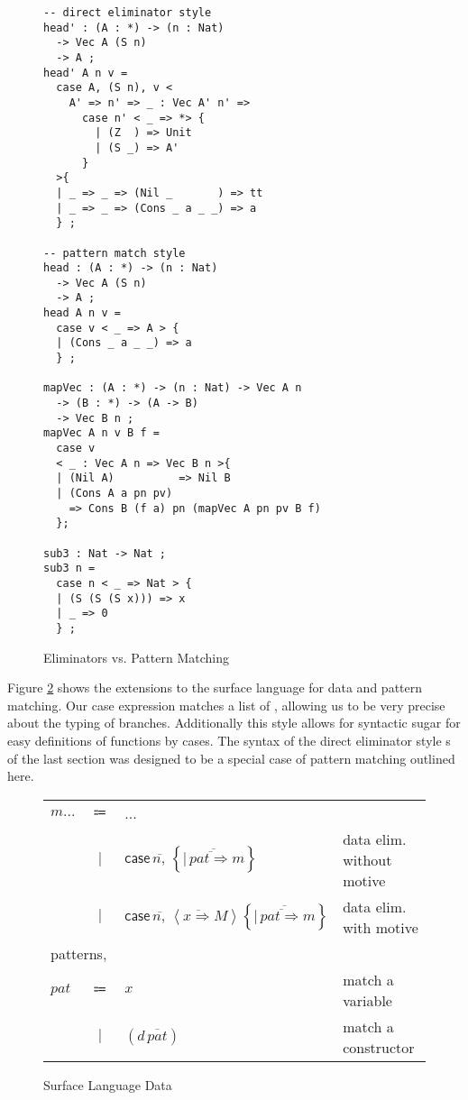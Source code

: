 \begin{figure}
\begin{lstlisting}[basicstyle={\ttfamily\small}]
-- direct eliminator style
head' : (A : *) -> (n : Nat)
  -> Vec A (S n) 
  -> A ;
head' A n v =
  case A, (S n), v <
    A' => n' => _ : Vec A' n' =>
      case n' < _ => *> {
        | (Z  ) => Unit
        | (S _) => A'
      }
  >{
  | _ => _ => (Nil _       ) => tt
  | _ => _ => (Cons _ a _ _) => a
  } ;

-- pattern match style
head : (A : *) -> (n : Nat)
  -> Vec A (S n) 
  -> A ;
head A n v =
  case v < _ => A > {
  | (Cons _ a _ _) => a
  } ;

mapVec : (A : *) -> (n : Nat) -> Vec A n 
  -> (B : *) -> (A -> B)
  -> Vec B n ;
mapVec A n v B f =
  case v 
  < _ : Vec A n => Vec B n >{
  | (Nil A)          => Nil B
  | (Cons A a pn pv) 
    => Cons B (f a) pn (mapVec A pn pv B f)
  };

sub3 : Nat -> Nat ;
sub3 n =
  case n < _ => Nat > {
  | (S (S (S x))) => x
  | _ => 0
  } ;
\end{lstlisting}



\caption{Eliminators vs. Pattern Matching}
\label{fig:data-eliminators}
\end{figure}

Figure \ref{fig:surface-data} shows the extensions to the surface language for data and pattern matching.
Our case expression matches a list of \scruts{}, allowing us to be very precise about the typing of branches.
Additionally this style allows for syntactic sugar for easy definitions of functions by cases.
The syntax of the direct eliminator style \case{}s of the last section was designed to be a special case of pattern matching outlined here.

\begin{figure}
\begin{tabular}{lcll}
$m...$ & $\Coloneqq$ & ... & \tabularnewline
 & $|$ & $\mathsf{case}\,\overline{n,}\,\left\{ \overline{|\,\overline{pat\Rightarrow}m}\right\} $ & data elim. without motive\tabularnewline
 & $|$ & $\mathsf{case}\,\overline{n,}\,\left\langle \overline{x\Rightarrow}M\right\rangle \left\{ \overline{|\,\overline{pat\Rightarrow}m}\right\} $ & data elim. with motive\tabularnewline
\multicolumn{4}{l}{patterns,}\tabularnewline
$pat$ & $\Coloneqq$ & $x$ & match a variable\tabularnewline
 & $|$ & $(d\,\overline{pat})$ & match a constructor\tabularnewline
\end{tabular}

\caption{Surface Language Data}
\label{fig:surface-data}
\end{figure}

